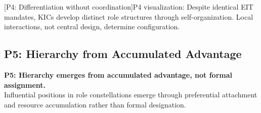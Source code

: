 \documentclass[../main.tex]{subfiles}
\begin{document}
\begin{center}
[P4: Differentiation without coordination]{P4 visualization: Despite identical EIT mandates, KICs develop distinct role structures through self-organization. Local interactions, not central design, determine configuration.}
\end{center}

\vspace{0.5cm}
\subsection{P5: Hierarchy from Accumulated Advantage}

\begin{propositionbox}
\textbf{P5: Hierarchy emerges from accumulated advantage, not formal assignment.}\\[3pt]
Influential positions in role constellations emerge through preferential attachment and resource accumulation rather than formal designation.
\end{propositionbox}
\end{document}
